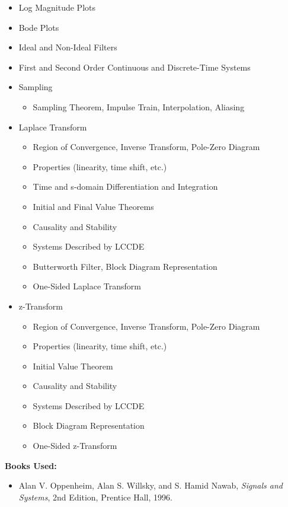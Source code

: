 \documentclass[12pt]{article}
\begin{document}
\begin{itemize}
    \item Log Magnitude Plots
    \item Bode Plots
    \item Ideal and Non-Ideal Filters
    \item First and Second Order Continuous and Discrete-Time Systems
    \item Sampling
    \begin{itemize}
        \item Sampling Theorem, Impulse Train, Interpolation, Aliasing
    \end{itemize}
    \item Laplace Transform
    \begin{itemize}
        \item Region of Convergence, Inverse Transform, Pole-Zero Diagram
        \item Properties (linearity, time shift, etc.)
        \item Time and s-domain Differentiation and Integration
        \item Initial and Final Value Theorems
        \item Causality and Stability
        \item Systems Described by LCCDE
        \item Butterworth Filter, Block Diagram Representation
        \item One-Sided Laplace Transform
    \end{itemize}
    \item z-Transform
    \begin{itemize}
        \item Region of Convergence, Inverse Transform, Pole-Zero Diagram
        \item Properties (linearity, time shift, etc.)
        \item Initial Value Theorem
        \item Causality and Stability
        \item Systems Described by LCCDE
        \item Block Diagram Representation
        \item One-Sided z-Transform
    \end{itemize}
\end{itemize}

\textbf{Books Used:}
\begin{itemize}
    \item Alan V. Oppenheim, Alan S. Willsky, and S. Hamid Nawab, \textit{Signals and Systems}, 2nd Edition, Prentice Hall, 1996.
\end{itemize}
\end{document}
